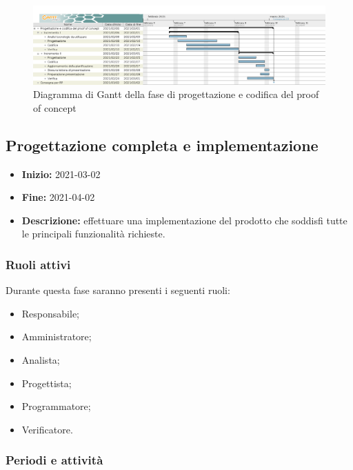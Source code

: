 \begin{figure}[H]
    \centering
    \includegraphics[width=1\linewidth]{res/images/pianificazione/progettazione_e_codifica_del_proof_of_concept.png}
    \caption{Diagramma di Gantt della fase di progettazione e codifica del proof of concept}
    \label{fig:_Gantt progettazione e codifica del proof of concept}
\end{figure}



\subsection{Progettazione completa e implementazione} \label{_pianificazioneProgettazioneCompletaImplementazione}
\begin{itemize}
    \item []\textbf{Inizio:} 2021-03-02
    \item []\textbf{Fine:} 2021-04-02
    \item []\textbf{Descrizione:} effettuare una implementazione del prodotto che soddisfi tutte le principali funzionalità richieste.
\end{itemize}

\subsubsection{Ruoli attivi}
Durante questa fase saranno presenti i seguenti ruoli:
\begin{itemize}
    \item Responsabile;
    \item Amministratore;
    \item Analista;
    \item Progettista;
    \item Programmatore;
    \item Verificatore.
\end{itemize}

\subsubsection{Periodi e attività}

